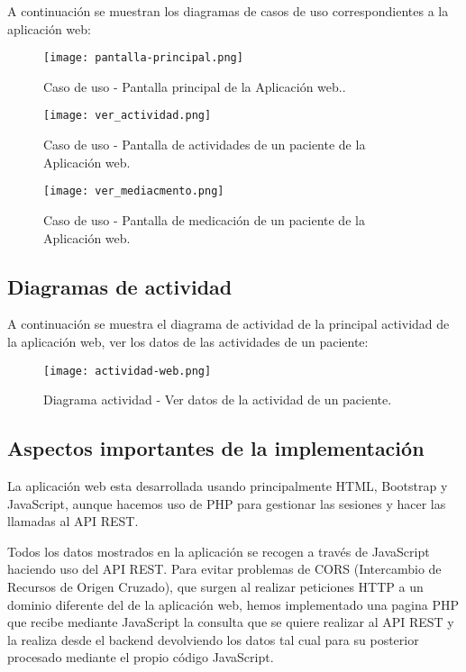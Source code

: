 A continuación se muestran los diagramas de casos de uso correspondientes a la aplicación web:
\newline

\begin{figure}[H]
  \centering
  \texttt{[image: pantalla-principal.png]}
  \caption{Caso de uso - Pantalla principal de la Aplicación web..}
\end{figure}

\begin{figure}[H]
  \centering
  \texttt{[image: ver\_actividad.png]}
  \caption{Caso de uso - Pantalla de actividades de un paciente de la Aplicación web.}
\end{figure}

\begin{figure}[H]
  \centering
  \texttt{[image: ver\_mediacmento.png]}
  \caption{Caso de uso - Pantalla de medicación de un paciente de la Aplicación web.}
\end{figure}


\subsection{Diagramas de actividad}
A continuación se muestra el diagrama de actividad de la principal actividad de la aplicación web, ver los datos de las actividades de un paciente:

\begin{figure}[H]
  \centering
  \texttt{[image: actividad-web.png]}
  \caption{Diagrama actividad - Ver datos de la actividad de un paciente.}
\end{figure}

\subsection{Aspectos importantes de la implementación}

La aplicación web esta desarrollada usando principalmente HTML, Bootstrap y JavaScript, aunque hacemos uso de PHP para gestionar las sesiones y hacer las llamadas al API REST.
\newline

Todos los datos mostrados en la aplicación se recogen a través de JavaScript haciendo uso del API REST. Para evitar problemas de CORS (Intercambio de Recursos de Origen Cruzado), que surgen al realizar peticiones HTTP a un dominio diferente del de la aplicación web, hemos implementado una pagina PHP que recibe mediante JavaScript la consulta que se quiere realizar al API REST y la realiza desde el backend devolviendo los datos tal cual para su posterior procesado mediante el propio código JavaScript.
\newline


